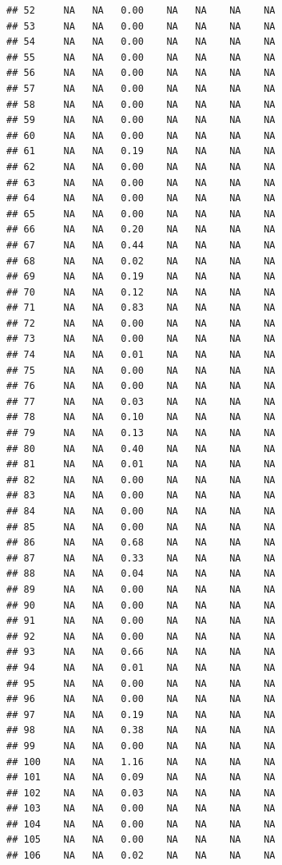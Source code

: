 \documentclass{article}\usepackage{graphicx, color}
\makeatletter
\newenvironment{kframe}{%
 \def\at@end@of@kframe{}%
 \ifinner\ifhmode%
  \def\at@end@of@kframe{\end{minipage}}%
  \begin{minipage}{\columnwidth}%
 \fi\fi%
 \def\FrameCommand##1{\hskip\@totalleftmargin \hskip-\fboxsep
 \colorbox{shadecolor}{##1}\hskip-\fboxsep
     \hskip-\linewidth \hskip-\@totalleftmargin \hskip\columnwidth}%
 \MakeFramed {\advance\hsize-\width
   \@totalleftmargin\z@ \linewidth\hsize
   \@setminipage}}%
 {\par\unskip\endMakeFramed%
 \at@end@of@kframe}
\newenvironment{knitrout}{}{} %
\makeatother
\begin{document}
\begin{knitrout}
\begin{kframe}
\begin{verbatim}
## 52     NA   NA   0.00    NA   NA    NA    NA
## 53     NA   NA   0.00    NA   NA    NA    NA
## 54     NA   NA   0.00    NA   NA    NA    NA
## 55     NA   NA   0.00    NA   NA    NA    NA
## 56     NA   NA   0.00    NA   NA    NA    NA
## 57     NA   NA   0.00    NA   NA    NA    NA
## 58     NA   NA   0.00    NA   NA    NA    NA
## 59     NA   NA   0.00    NA   NA    NA    NA
## 60     NA   NA   0.00    NA   NA    NA    NA
## 61     NA   NA   0.19    NA   NA    NA    NA
## 62     NA   NA   0.00    NA   NA    NA    NA
## 63     NA   NA   0.00    NA   NA    NA    NA
## 64     NA   NA   0.00    NA   NA    NA    NA
## 65     NA   NA   0.00    NA   NA    NA    NA
## 66     NA   NA   0.20    NA   NA    NA    NA
## 67     NA   NA   0.44    NA   NA    NA    NA
## 68     NA   NA   0.02    NA   NA    NA    NA
## 69     NA   NA   0.19    NA   NA    NA    NA
## 70     NA   NA   0.12    NA   NA    NA    NA
## 71     NA   NA   0.83    NA   NA    NA    NA
## 72     NA   NA   0.00    NA   NA    NA    NA
## 73     NA   NA   0.00    NA   NA    NA    NA
## 74     NA   NA   0.01    NA   NA    NA    NA
## 75     NA   NA   0.00    NA   NA    NA    NA
## 76     NA   NA   0.00    NA   NA    NA    NA
## 77     NA   NA   0.03    NA   NA    NA    NA
## 78     NA   NA   0.10    NA   NA    NA    NA
## 79     NA   NA   0.13    NA   NA    NA    NA
## 80     NA   NA   0.40    NA   NA    NA    NA
## 81     NA   NA   0.01    NA   NA    NA    NA
## 82     NA   NA   0.00    NA   NA    NA    NA
## 83     NA   NA   0.00    NA   NA    NA    NA
## 84     NA   NA   0.00    NA   NA    NA    NA
## 85     NA   NA   0.00    NA   NA    NA    NA
## 86     NA   NA   0.68    NA   NA    NA    NA
## 87     NA   NA   0.33    NA   NA    NA    NA
## 88     NA   NA   0.04    NA   NA    NA    NA
## 89     NA   NA   0.00    NA   NA    NA    NA
## 90     NA   NA   0.00    NA   NA    NA    NA
## 91     NA   NA   0.00    NA   NA    NA    NA
## 92     NA   NA   0.00    NA   NA    NA    NA
## 93     NA   NA   0.66    NA   NA    NA    NA
## 94     NA   NA   0.01    NA   NA    NA    NA
## 95     NA   NA   0.00    NA   NA    NA    NA
## 96     NA   NA   0.00    NA   NA    NA    NA
## 97     NA   NA   0.19    NA   NA    NA    NA
## 98     NA   NA   0.38    NA   NA    NA    NA
## 99     NA   NA   0.00    NA   NA    NA    NA
## 100    NA   NA   1.16    NA   NA    NA    NA
## 101    NA   NA   0.09    NA   NA    NA    NA
## 102    NA   NA   0.03    NA   NA    NA    NA
## 103    NA   NA   0.00    NA   NA    NA    NA
## 104    NA   NA   0.00    NA   NA    NA    NA
## 105    NA   NA   0.00    NA   NA    NA    NA
## 106    NA   NA   0.02    NA   NA    NA    NA

\end{verbatim}
\end{kframe}
\end{knitrout}
\end{document}
